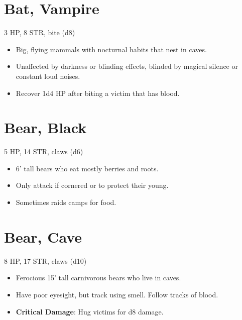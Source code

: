 \documentclass[
  10pt,
  american,
]{article}
\begin{document}
\hypertarget{bat-vampire}{%
\section{Bat, Vampire}\label{bat-vampire}}

3 HP, 8 STR, bite (d8)

\begin{samepage}
\begin{itemize}
\setlength\itemsep{-.5em}
\item Big, flying mammals with nocturnal habits that nest in caves.
\item Unaffected by darkness or blinding effects, blinded by magical silence or constant loud noises.
\item Recover 1d4 HP after biting a victim that has blood.
\end{itemize}
\end{samepage}

\hypertarget{bear-black}{%
\section{Bear, Black}\label{bear-black}}

5 HP, 14 STR, claws (d6)

\begin{samepage}
\begin{itemize}
\setlength\itemsep{-.5em}
\item 6’ tall bears who eat mostly berries and roots.
\item Only attack if cornered or to protect their young.
\item Sometimes raids camps for food.
\end{itemize}
\end{samepage}

\hypertarget{bear-cave}{%
\section{Bear, Cave}\label{bear-cave}}

8 HP, 17 STR, claws (d10)

\begin{samepage}
\begin{itemize}
\setlength\itemsep{-.5em}
\item Ferocious 15’ tall carnivorous bears who live in caves.
\item Have poor eyesight, but track using smell.   Follow tracks of blood.
\item \textbf{Critical Damage}: Hug victims for d8 damage.
\end{itemize}
\end{samepage}
\end{document}
